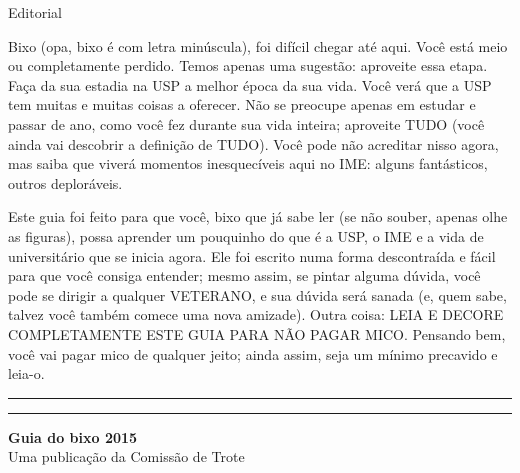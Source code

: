 \begin{editorial}{Editorial}

Bixo (opa, bixo é com letra minúscula), foi difícil chegar até aqui. Você está
meio ou completamente perdido. Temos apenas uma sugestão: aproveite essa etapa.
Faça da sua estadia na USP a melhor época da sua vida. Você verá que a USP tem
muitas e muitas coisas a oferecer. Não se preocupe apenas em estudar e passar de
ano, como você fez durante sua vida inteira; aproveite TUDO (você ainda vai
descobrir a definição de TUDO). Você pode não acreditar nisso agora, mas saiba
que viverá momentos inesquecíveis aqui no IME: alguns fantásticos, outros deploráveis.

Este guia foi feito para que você, bixo que já sabe ler (se não souber, apenas olhe
as figuras), possa aprender um pouquinho do que é a USP, o IME e a vida de
universitário que se inicia agora. Ele foi escrito numa forma descontraída e
fácil para que você consiga entender; mesmo assim, se pintar alguma dúvida,
você pode se dirigir a qualquer VETERANO, e sua dúvida será sanada (e, quem sabe,
talvez você também comece uma nova amizade). Outra coisa: LEIA E DECORE
COMPLETAMENTE ESTE GUIA PARA NÃO PAGAR MICO. Pensando bem, você vai pagar mico
de qualquer jeito; ainda assim, seja um mínimo precavido e leia-o.


\rule{\textwidth}{0.5ex}\rule{2ex}{0.5ex}

{\large\bf Guia do bixo 2015} \\
Uma publicação da Comissão de Trote


\end{editorial}
